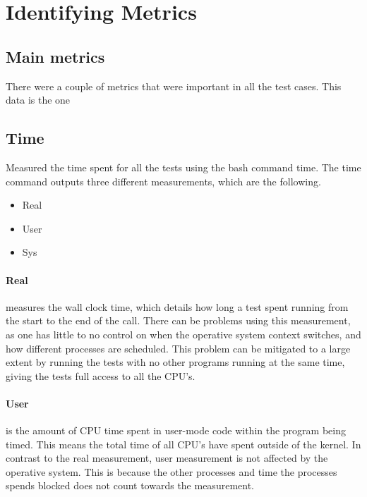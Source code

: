 \section{Identifying Metrics}

\subsection{Main metrics}
There were a couple of metrics that were important in all the test cases.
This data is the one 


\subsection{Time}
Measured the time spent for all the tests using the bash command time.
The time command outputs three different measurements, which are the following.

\begin{itemize}
    \item Real
    \item User
    \item Sys
\end{itemize}

\paragraph{Real}measures the wall clock time, which details how long a test spent running from the start to the end of the call.
There can be problems using this measurement, as one has little to no control on when the operative system context switches, and how different processes are scheduled.
This problem can be mitigated to a large extent by running the tests with no other programs running at the same time, giving the tests full access to all the CPU's.

\paragraph{User}is the amount of CPU time spent in user-mode code within the program being timed.
This means the total time of all CPU's have spent outside of the kernel.
In contrast to the real measurement, user measurement is not affected by the operative system.
This is because the other processes and time the processes spends blocked does not count towards the measurement.

